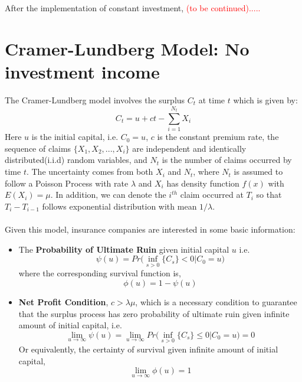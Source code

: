 \documentclass[12pt]{article}
\begin{document}
After the implementation of constant investment, \textcolor{red}{(to be continued).....}


\newpage
\section{Cramer-Lundberg Model: No investment income}
The Cramer-Lundberg model involves the surplus $C_t$ at time \(t\) which is given by\cite{ref01}:
\begin{equation}\label{CL-model}
    C_t = u+ct-\sum_{i=1}^{N_t}X_i
\end{equation}
Here \(u\) is the initial capital, i.e.  \(C_0=u\), \(c\) is the constant premium rate, the sequence of claims \(\{X_1, X_2, ..., X_i\}\) are independent and identically distributed(i.i.d) random variables, and \(N_t\) is the number of claims occurred by time \(t\). The uncertainty comes from both \(X_i\) and \(N_t\), where \(N_t\) is assumed to follow a Poisson Process with rate \(\lambda\) and \(X_i\) has density function \(f(x)\) with \(E(X_i)=\mu\). In addition, we can denote the \(i^{th}\) claim occurred at \(T_i\) so that \(T_i-T_{i-1}\) follows exponential distribution with mean \(1/\lambda\).\\
 \\
Given this model, insurance companies are interested in some basic information:
\begin{itemize}
  \item The \textbf{Probability of Ultimate Ruin} given initial capital \(u\) i.e.
    \begin{equation}\label{Pr-Ul-ruin}
        \psi(u) = Pr\Big(\inf_{s>0}\{C_s\}<0|C_0=u\Big)
    \end{equation}
    where the corresponding survival function is,
    \begin{equation}\label{survival-f}
        \phi(u) = 1-\psi(u)
    \end{equation}
  \item \textbf{Net Profit Condition}, \(c>\lambda\mu\), which is a necessary condition to guarantee that the surplus process has zero 
  probability of ultimate ruin given infinite amount of initial capital, i.e.
    \begin{equation}\label{net-profit1}
        \lim_{u\to\infty}\psi(u)=\lim_{u\to\infty}Pr\Big(\inf_{s>0}\{C_s\}\leq0|C_0=u\Big)=0
    \end{equation}
    Or equivalently, the certainty of survival given infinite amount of initial capital,
    \begin{equation}\label{net-profit}
        \lim_{u\to\infty}\phi(u)=1
    \end{equation}
\end{itemize}
\end{document}
